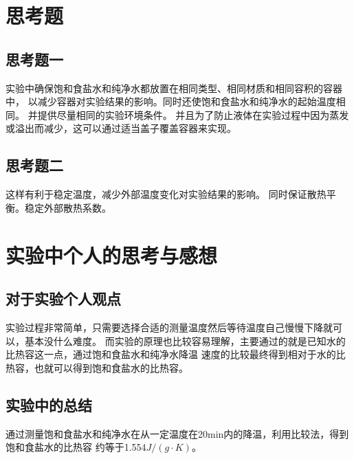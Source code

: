 \documentclass{ctexart}
\begin{document}
\section{思考题}
  \subsection{思考题一}
  实验中确保饱和食盐水和纯净水都放置在相同类型、相同材质和相同容积的容器中，
  以减少容器对实验结果的影响。同时还使饱和食盐水和纯净水的起始温度相同。
  并提供尽量相同的实验环境条件。
  并且为了防止液体在实验过程中因为蒸发或溢出而减少，这可以通过适当盖子覆盖容器来实现。

  \subsection{思考题二}
  这样有利于稳定温度，减少外部温度变化对实验结果的影响。
  同时保证散热平衡。稳定外部散热系数。

\section{实验中个人的思考与感想}
  \subsection{对于实验个人观点}
  实验过程非常简单，只需要选择合适的测量温度然后等待温度自己慢慢下降就可以，基本没什么难度。
  而实验的原理也比较容易理解，主要通过的就是已知水的比热容这一点，通过饱和食盐水和纯净水降温
  速度的比较最终得到相对于水的比热容，也就可以得到饱和食盐水的比热容。

  \subsection{实验中的总结}
  通过测量饱和食盐水和纯净水在从一定温度在20min内的降温，利用比较法，得到饱和食盐水的比热容
  约等于1.554$J / (g \cdot K)$。
\end{document}
